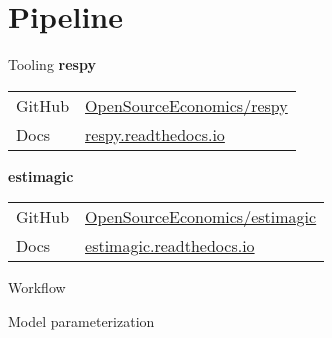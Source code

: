\section{Pipeline}
\begin{frame}{Tooling}\vspace{0.25cm}
\textbf{respy}\\
\medskip
\begin{tabular}{ll}
GitHub  & \url{OpenSourceEconomics/respy}\\\medskip
Docs    & \url{respy.readthedocs.io}\\
\end{tabular}\bigskip

\textbf{estimagic}\\
\medskip
\begin{tabular}{ll}
GitHub	& \url{OpenSourceEconomics/estimagic}\\\medskip
Docs    & \url{estimagic.readthedocs.io}\\
\end{tabular}

\end{frame}
\begin{frame}{Workflow}
	\begin{figure}
	   
   \end{figure}
\end{frame}
\begin{frame}{Model parameterization}

	\begin{figure}[h!]\centering
	\end{figure}

\end{frame}
